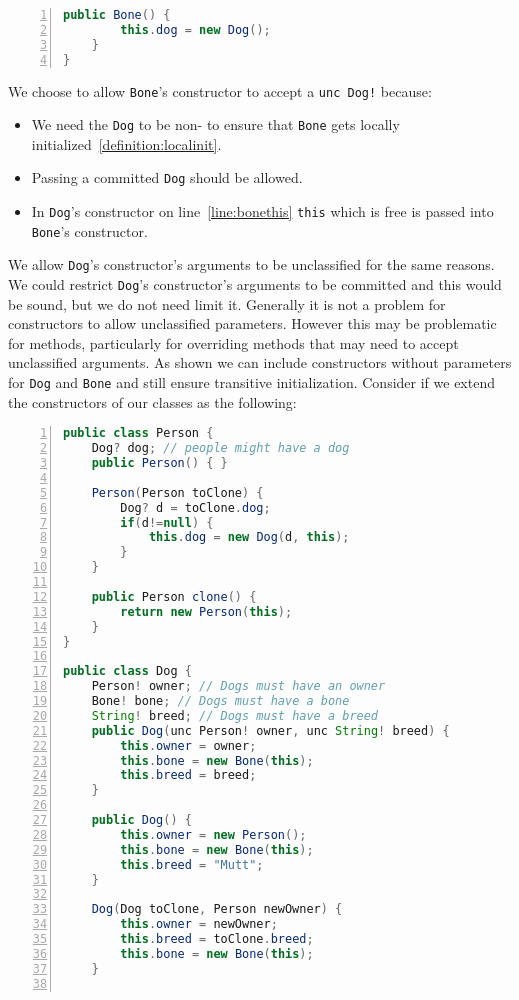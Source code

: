 \documentclass{article}
\begin{document}
\begin{example}
\begin{lstlisting}[language=Java, escapechar=|, numbers=left]
    public Bone() {
        this.dog = new Dog();
    }
}
\end{lstlisting}
  We choose to allow \texttt{Bone}'s constructor to accept a \texttt{unc Dog!} because:
  \begin{itemize}
  \item We need the \texttt{Dog} to be non-\cringe{} to ensure that \texttt{Bone} gets locally initialized~\ref{definition:localinit}.
  \item Passing a committed \texttt{Dog} should be allowed.
  \item In \texttt{Dog}'s constructor on line~\ref{line:bonethis} \texttt{this} which is free is passed into \texttt{Bone}'s constructor.
  \end{itemize}
  We allow \texttt{Dog}'s constructor's arguments to be unclassified for the same reasons.
  We could restrict \texttt{Dog}'s constructor's arguments to be committed and this would be sound, but we do not need limit it.
  Generally it is not a problem for constructors to allow unclassified parameters.
  However this may be problematic for methods, particularly for overriding methods that may need to accept unclassified arguments.
  As shown we can include constructors without parameters for \texttt{Dog} and \texttt{Bone} and still ensure transitive initialization.
  Consider if we extend the constructors of our classes as the following:
\begin{lstlisting}[language=Java, escapechar=|, numbers=left]
 public class Person {
    Dog? dog; // people might have a dog
    public Person() { }

    Person(Person toClone) {
        Dog? d = toClone.dog;
        if(d!=null) {
            this.dog = new Dog(d, this);
        }
    }

    public Person clone() {
        return new Person(this);
    }
}

public class Dog {
    Person! owner; // Dogs must have an owner
    Bone! bone; // Dogs must have a bone
    String! breed; // Dogs must have a breed
    public Dog(unc Person! owner, unc String! breed) {
        this.owner = owner;
        this.bone = new Bone(this);
        this.breed = breed;
    }

    public Dog() {
        this.owner = new Person();
        this.bone = new Bone(this);
        this.breed = "Mutt";
    }

    Dog(Dog toClone, Person newOwner) {
        this.owner = newOwner;
        this.breed = toClone.breed;
        this.bone = new Bone(this);
    }


\end{lstlisting}
\end{example}
\end{document}
